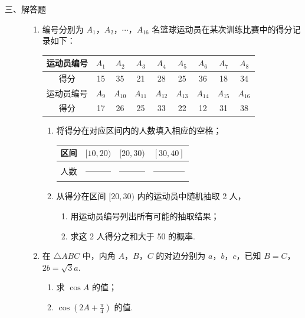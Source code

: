 \begin{description}

    \item[三、解答题]

    \begin{enumerate}[leftmargin=5pt]

      \addtocounter{enumi}{+14}

        \item 编号分别为 \(A_{1}\)，\(A_{2}\)，\(\cdots\)，\(A_{16}\) 名篮球运动员在某次训练比赛中的得分记录如下：

\begin{center}
\begin{tabular}{|c|c|c|c|c|c|c|c|c|}
\hline
运动员编号 & \(A_{1}\) & \(A_{2}\) & \(A_{3}\) & \(A_{4}\) & \(A_{5}\) & \(A_{6}\) & \(A_{7}\) & \(A_{8}\) \\
\hline
得分 & 15 & 35 & 21 & 28 & 25 & 36 & 18 & 34 \\
\hline
运动员编号 & \(A_{9}\) & \(A_{10}\) & \(A_{11}\) & \(A_{12}\) & \(A_{13}\) & \(A_{14}\) & \(A_{15}\) & \(A_{16}\) \\
\hline
得分 & 17 & 26 & 25 & 33 & 22 & 12 & 31 & 38 \\
\hline
\end{tabular}
\end{center}

\begin{enumerate}
    \item 将得分在对应区间内的人数填入相应的空格；
    \begin{center}
    \begin{tabular}{|c|c|c|c|}
    \hline
    区间 & \([10,20)\) & \([20,30)\) & \([30,40]\) \\
    \hline
    人数 &\rule[-0.3ex]{3em}{0.4pt}&\rule[-0.3ex]{3em}{0.4pt}&\rule[-0.3ex]{3em}{0.4pt} \\
    \hline
    \end{tabular}
    \end{center}
    \item 从得分在区间 \([20, 30)\) 内的运动员中随机抽取 2 人，
    \begin{enumerate}
    \item 用运动员编号列出所有可能的抽取结果；
    \item 求这 2 人得分之和大于 50 的概率.
    \end{enumerate}
\end{enumerate}

        \item 在 \(\triangle ABC\) 中，内角 \(A\)，\(B\)，\(C\) 的对边分别为 \(a\)，\(b\)，\(c\)，已知 \(B = C\)，\(2b = \sqrt{3}a\).
\begin{enumerate}
\item 求 \(\cos A\) 的值；
\item \(\cos \left(2A + \frac{\pi}{4}\right)\) 的值.
\end{enumerate}


\end{enumerate}
\end{description}
